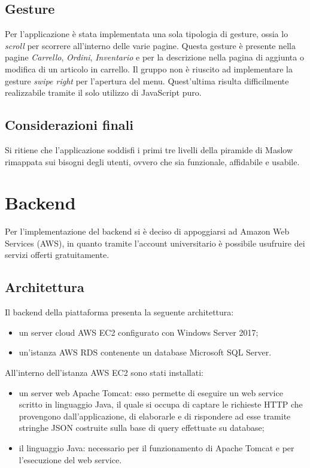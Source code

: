\documentclass[12pt, a4paper, titlepage]{report}
\begin{document}
	\subsection{Gesture}
	
	Per l'applicazione è stata implementata una sola tipologia di gesture, ossia lo \textit{scroll} per scorrere all'interno delle varie pagine. Questa gesture è presente nella pagine \textit{Carrello}, \textit{Ordini}, \textit{Inventario} e per la descrizione nella pagina di aggiunta o modifica di un articolo in carrello.
	Il gruppo non è riuscito ad implementare la gesture \textit{swipe right} per l'apertura del menu. Quest'ultima risulta difficilmente realizzabile tramite il solo utilizzo di JavaScript puro.
	
	\subsection{Considerazioni finali}
	
	Si ritiene che l'applicazione soddisfi i primi tre livelli della piramide di Maslow rimappata sui bisogni degli utenti, ovvero che sia funzionale, affidabile e usabile.
	
	\section{Backend}
	
	Per l'implementazione del backend si è deciso di appoggiarsi ad Amazon Web Services (AWS), in quanto tramite l'account universitario è possibile usufruire dei servizi offerti gratuitamente.
	
	\subsection{Architettura}
	
	Il backend della piattaforma presenta la seguente architettura:
	\begin{itemize}
		\item un server cloud AWS EC2 configurato con Windows Server 2017;
		\item un'istanza AWS RDS contenente un database Microsoft SQL Server.
	\end{itemize}
	All'interno dell'istanza AWS EC2 sono stati installati:
	\begin{itemize}
		\item un server web Apache Tomcat: esso permette di eseguire un web service scritto in linguaggio Java, il quale si occupa di captare le richieste HTTP che provengono dall'applicazione, di elaborarle e di rispondere ad esse tramite stringhe JSON costruite sulla base di query effettuate su database;
		\item il linguaggio Java: necessario per il funzionamento di Apache Tomcat e per l'esecuzione del web service.
	\end{itemize}
\end{document}
